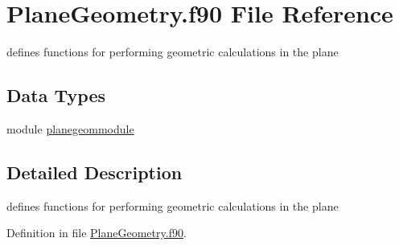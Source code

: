 \hypertarget{_plane_geometry_8f90}{\section{Plane\+Geometry.\+f90 File Reference}
\label{_plane_geometry_8f90}
}


defines functions for performing geometric calculations in the plane  


\subsection*{Data Types}
\begin{DoxyCompactItemize}
\item 
module \hyperlink{classplanegeommodule}{planegeommodule}
\end{DoxyCompactItemize}


\subsection{Detailed Description}
defines functions for performing geometric calculations in the plane 



Definition in file \hyperlink{_plane_geometry_8f90_source}{Plane\+Geometry.\+f90}.

